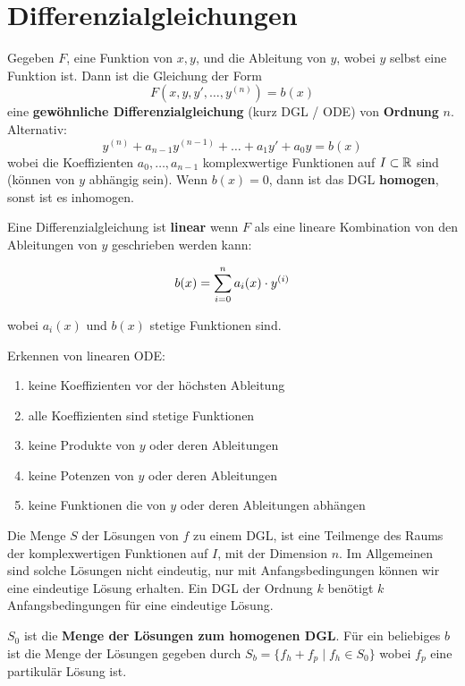\section{Differenzialgleichungen}

\begin{tcolorbox}
	Gegeben $F$, eine Funktion von $x,y$, und die Ableitung von $y$, wobei $y$ selbst eine Funktion ist.
	Dann ist die Gleichung der Form
	$$F(x,y,y', \dots, y^{(n)}) = b(x)$$
	eine \textbf{gewöhnliche Differenzialgleichung} (kurz DGL / ODE) von \textbf{Ordnung} $n$. Alternativ:
	$$y^{(n)} + a_{n-1}y^{(n-1)} + \dots + a_1 y' + a_0 y = b(x)$$
	wobei die Koeffizienten $a_0, \dots, a_{n-1}$ komplexwertige Funktionen auf $I \subset \mathbb{R}$ sind (können
	von $y$ abhängig sein). Wenn $b(x) = 0$, 
	dann ist das DGL \textbf{homogen}, sonst ist es inhomogen. 
\end{tcolorbox}

Eine Differenzialgleichung ist \textbf{linear} wenn $F$ als eine lineare Kombination von den Ableitungen von $y$ 
geschrieben werden kann:

$$b(x) = \sum\limits_{i = 0}^{n}a_i(x) \cdot y^{(i)}$$

wobei $a_i(x)$ und $b(x)$ stetige Funktionen sind.

Erkennen von linearen ODE:
\begin{enumerate}[label=(\arabic*)]
    \item keine Koeffizienten vor der höchsten Ableitung
    \item alle Koeffizienten sind stetige Funktionen
    \item keine Produkte von $y$ oder deren Ableitungen
    \item keine Potenzen von $y$ oder deren Ableitungen
    \item keine Funktionen die von $y$ oder deren Ableitungen abhängen
\end{enumerate}

Die Menge $S$ der Lösungen von $f$ zu einem DGL, ist eine Teilmenge des Raums der komplexwertigen Funktionen auf 
$I$, mit der Dimension $n$. Im Allgemeinen sind solche Lösungen nicht eindeutig, nur mit Anfangsbedingungen können
wir eine eindeutige Lösung erhalten. Ein DGL der Ordnung $k$ benötigt $k$ Anfangsbedingungen für eine eindeutige
Lösung. \medskip 

$S_0$ ist die \textbf{Menge der Lösungen zum homogenen DGL}. Für ein beliebiges $b$ ist die Menge 
der Lösungen gegeben durch $S_b = \{f_h + f_p \;|\; f_h \in S_0\}$ wobei $f_p$ eine 
partikulär Lösung ist. \medskip

